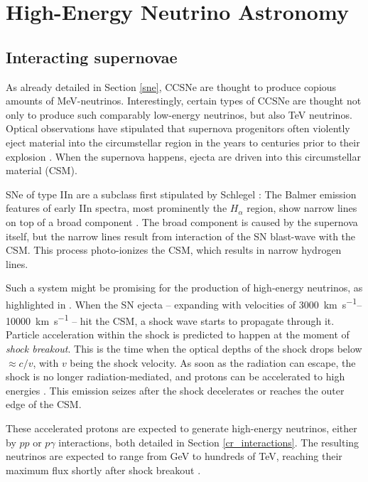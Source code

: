 \documentclass[
    a4paper, %
    fontsize=10pt, %
    twoside=false, %
    numbers=noenddot, %
    fontmethod=tex,
]{kaobook}
\begin{document}
\section{High-Energy Neutrino Astronomy}
\subsection{Interacting supernovae} \label{interacting_sne}
As already detailed in Section \ref{sne}, CCSNe are thought to produce copious amounts of \unit{\mega\eV}-neutrinos. Interestingly, certain types of CCSNe are thought not only to produce such comparably low-energy neutrinos, but also \unit{\tera\eV} neutrinos. Optical observations have stipulated that supernova progenitors often violently eject material into the circumstellar region in the years to centuries prior to their explosion . When the supernova happens, ejecta are driven into this circumstellar material (CSM).

SNe of type IIn are a subclass first stipulated by Schlegel : The Balmer emission features of early IIn spectra, most prominently the $H_\alpha$ region, show narrow lines on top of a broad component . The broad component is caused by the supernova itself, but the narrow lines result from interaction of the SN blast-wave with the CSM. This process photo-ionizes the CSM, which results in narrow hydrogen lines.

Such a system might be promising for the production of high-energy neutrinos, as highlighted in . When the SN ejecta -- expanding with velocities of \SIrange{3000}{10000}{\km\per\s} -- hit the CSM, a shock wave starts to propagate through it. Particle acceleration within the shock is predicted to happen at the moment of \textit{shock breakout}. This is the time when the optical depths of the shock drops below $\approx c/v$, with $v$ being the shock velocity. As soon as the radiation can escape, the shock is no longer radiation-mediated, and protons can be accelerated to high energies . This emission seizes after the shock decelerates or reaches the outer edge of the CSM. 

These accelerated protons are expected to generate high-energy neutrinos, either by $pp$ or $p\gamma$ interactions, both detailed in Section \ref{cr_interactions}. The resulting neutrinos are expected to range from \unit{\giga\eV} to hundreds of \unit{\tera\eV}, reaching their maximum flux shortly after shock breakout .
\end{document}
